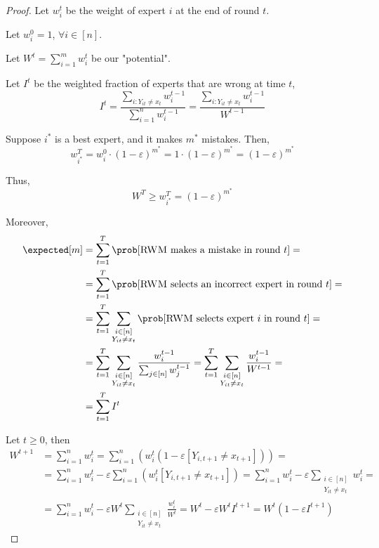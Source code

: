     \begin{proof}
        Let $w_i^t$ be the weight of expert $i$ at the end of round $t$.

        Let $w_i^0 = 1$, $\forall i \in [n]$.

        Let $W^t = \sum_{i=1}^{m} w_i^t$ be our "potential".

        Let $I^t$ be the weighted fraction of experts that are wrong at time $t$,
        \[ I^t = \frac{\sum_{i : Y_{it} \neq x_t} w_i^{t-1}}{\sum_{i=1}^{n} w_i^{t-1}} = \frac{\sum_{i : Y_{it} \neq x_t} w_i^{t-1}}{W^{t-1}} \]

        Suppose $i^*$ is a best expert, and it makes $m^*$ mistakes.
        Then,
        \[ w_{i^*}^T = w_i^0 \cdot (1 - \varepsilon)^{m^*} = 1 \cdot (1 - \varepsilon)^{m^*} = (1 - \varepsilon)^{m^*} \]

        Thus,
        \[ W^T \geq w_{i^*}^T = (1 - \varepsilon)^{m^*} \]

        Moreover,
        \begin{equation*}
            \begin{split}
                \expected[m] &= \sum_{t=1}^{T} \prob[\text{\textsc{RWM} makes a mistake in round } t] =\\
                    &= \sum_{t=1}^{T} \prob[\text{\textsc{RWM} selects an incorrect expert in round } t] =\\
                    &= \sum_{t=1}^{T} \sum_{\substack{i \in [n] \\ Y_{it} \neq x_t}} \prob[\text{\textsc{RWM} selects expert } i \text{ in round } t] =\\
                    &= \sum_{t=1}^{T} \sum_{\substack{i \in [n] \\ Y_{it} \neq x_t}} \frac{w_i^{t-1}}{\sum_{j \in [n]} w_j^{t-1}} = \sum_{t=1}^{T} \sum_{\substack{i \in [n] \\ Y_{it} \neq x_t}} \frac{w_i^{t-1}}{W^{t-1}} =\\
                    &= \sum_{t=1}^{T} I^t
            \end{split}
        \end{equation*}

        Let $t \geq 0$, then
        \begin{equation*}
            \begin{split}
                W^{t+1} &= \sum_{i=1}^{n} w_i^t = \sum_{i=1}^{n}(w_i^t (1 - \varepsilon [Y_{i, t+1} \neq x_{t+1}])) =\\
                    &= \sum_{i=1}^{n} w_i^t - \varepsilon \sum_{i=1}^{n} (w_i^t [Y_{i, t+1} \neq x_{t+1}]) = \sum_{i=1}^{n} w_i^t - \varepsilon \sum_{\substack{i \in [n] \\ Y_{it} \neq x_t}} w_i^t =\\
                    &= \sum_{i=1}^{n} w_i^t - \varepsilon W^t \sum_{\substack{i \in [n] \\ Y_{it} \neq x_t}} \frac{w_i^t}{W^t} = W^t - \varepsilon W^t I^{t+1} = W^t (1 - \varepsilon I^{t+1})
            \end{split}
        \end{equation*}


\end{proof}
